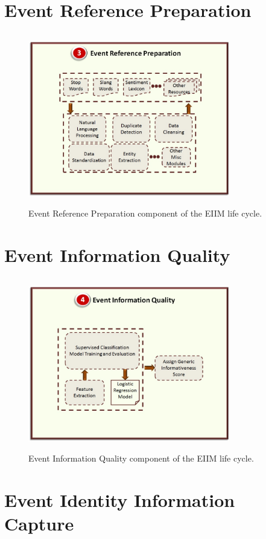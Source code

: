\section{Event Reference Preparation}

\begin{figure}[htbp]
  \caption{Event Reference Preparation component of the EIIM life cycle.}
  \centering
    \includegraphics[width=8.8cm,height=7.5cm]{Figures/EIIMComponents/EventReferencePreparation.jpg}
\end{figure}

\section{Event Information Quality}

\begin{figure}[htbp]
  \caption{Event Information Quality component of the EIIM life cycle.}
  \centering
    \includegraphics[width=8.8cm,height=7.5cm]{Figures/EIIMComponents/EventInformationQuality.jpg}
\end{figure}

\section{Event Identity Information Capture}

